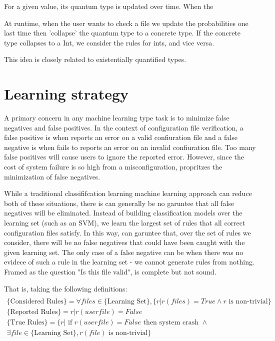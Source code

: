 For a given value, its quantum type is updated over time. When the 


At runtime, when the user wants to check a file we update the probabilities one last time then 'collapse' the quantum type to a concrete type.
If the concrete type collapses to a Int, we consider the rules for ints, and vice versa.

This idea is closely related to existentially quantified types.


\section{Learning strategy}

A primary concern in any machine learning type task is to minimize false negatives and false positives.
In the context of configuration file verification,
  a false positive is when \app reports an error on a valid confiuration file and
  a false negative is when \app fails to reports an error on an invalid confiuration file.
Too many false positives will cause users to ignore the reported error\cite{}.
However, since the cost of system failure is so high from a misconfiguration, \app propritzes the minimization of false negatives.

While a traditional classififcation learning machine learning approach can reduce both of these situations, there is can generally be no garuntee that all false negatives will be eliminated.
Instead of building classification models over the learning set (such as an SVM), we learn the largest set of rules that all correct configuration files satisfy.
In this way, \app can garuntee that, over the set of rules we consider, there will be no false negatives that could have been caught with the given learning set.
The only case of a false negative can be when there was no evidece of such a rule in the learning set - we cannot generate rules from nothing.
Framed as the question "Is this file valid", \app is complete but not sound. 

That is, taking the following definitions:
\begin{multline*}\\
\text{\{Considered Rules\}} = \forall files \in \text{\{Learning Set\}}, \{ r | r(files) = True \land r \text{ is non-trivial}\}\\
\text{\{Reported Rules\}} = {r | r(userfile)=False } \\
\text{\{True Rules\}} = \{r | \text{ if } r(userfile)=False \text{ then system crash } \land \\
   \exists file \in \text{\{Learning Set\}}, r(file) \text{ is non-trivial}\}
\end{multline*}


